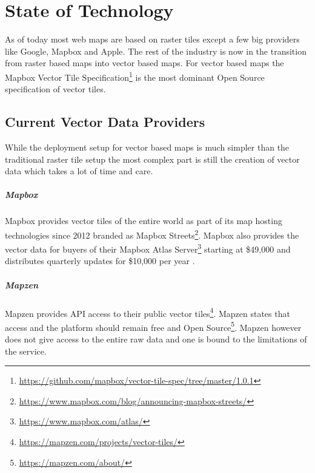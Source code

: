 \chapter{State of Technology}

As of today most web maps are based on raster tiles except a few big providers like Google, Mapbox and Apple.
The rest of the industry is now in the transition from raster based maps into vector based maps. For vector based maps the Mapbox Vector Tile Specification\footnote{\url{https://github.com/mapbox/vector-tile-spec/tree/master/1.0.1}} is the most dominant Open Source specification of vector tiles.

\section{Current Vector Data Providers}

While the deployment setup for vector based maps is much simpler than
the traditional raster tile setup the most complex part is still
the creation of vector data which takes a lot of time and care.

\paragraph{Mapbox}

Mapbox provides vector tiles of the entire world as part of its
map hosting technologies since 2012 branded as Mapbox Streets\footnote{\url{https://www.mapbox.com/blog/announcing-mapbox-streets/}}. Mapbox also provides the vector data for buyers of their Mapbox Atlas Server\footnote{\url{https://www.mapbox.com/atlas/}} starting at \$49,000 and distributes quarterly updates for \$10,000 per year .

\paragraph{Mapzen}

Mapzen provides API access to their public vector tiles\footnote{\url{https://mapzen.com/projects/vector-tiles/}}.
 Mapzen states that access and the platform should remain free and Open Source\footnote{\url{https://mapzen.com/about/}}. Mapzen however
does not give access to the entire raw data and one is bound to
the limitations of the service.

